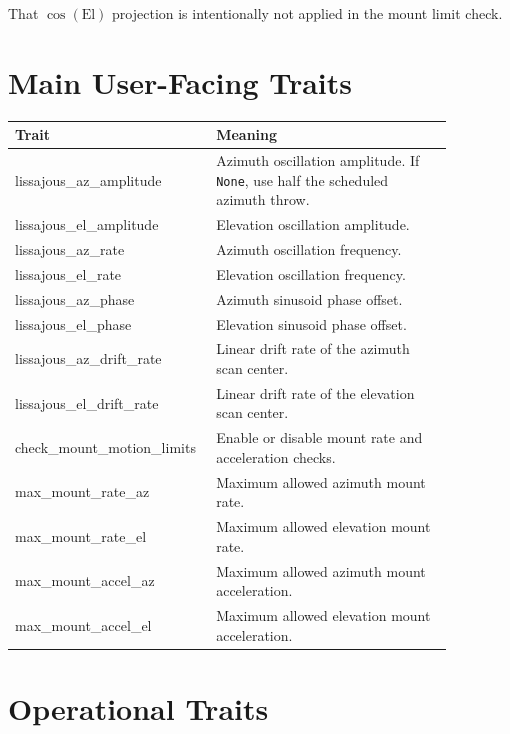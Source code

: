 \documentclass[11pt]{article}
\begin{document}
That \(\cos(\mathrm{El})\) projection is intentionally not applied in the mount
limit check.

\section*{Main User-Facing Traits}

\begin{center}
\begin{tabular}{>{\ttfamily}p{0.35\linewidth}
                >{\raggedright\arraybackslash}p{0.52\linewidth}}
\toprule
Trait & Meaning \\
\midrule
lissajous\_az\_amplitude & Azimuth oscillation amplitude.  If \texttt{None}, use half the scheduled azimuth throw. \\
lissajous\_el\_amplitude & Elevation oscillation amplitude. \\
lissajous\_az\_rate & Azimuth oscillation frequency. \\
lissajous\_el\_rate & Elevation oscillation frequency. \\
lissajous\_az\_phase & Azimuth sinusoid phase offset. \\
lissajous\_el\_phase & Elevation sinusoid phase offset. \\
lissajous\_az\_drift\_rate & Linear drift rate of the azimuth scan center. \\
lissajous\_el\_drift\_rate & Linear drift rate of the elevation scan center. \\
check\_mount\_motion\_limits & Enable or disable mount rate and acceleration checks. \\
max\_mount\_rate\_az & Maximum allowed azimuth mount rate. \\
max\_mount\_rate\_el & Maximum allowed elevation mount rate. \\
max\_mount\_accel\_az & Maximum allowed azimuth mount acceleration. \\
max\_mount\_accel\_el & Maximum allowed elevation mount acceleration. \\
\bottomrule
\end{tabular}
\end{center}

\section*{Operational Traits}
\end{document}
